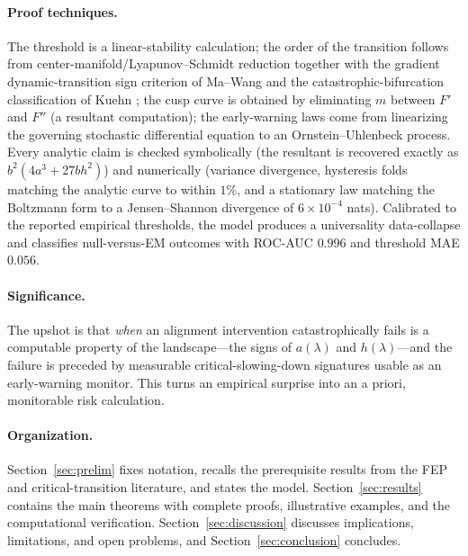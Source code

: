 \paragraph{Proof techniques.}
The threshold is a linear-stability calculation; the order of the transition follows from
center-manifold/Lyapunov--Schmidt reduction together with the gradient dynamic-transition
sign criterion of Ma--Wang \cite{mawang2008} and the catastrophic-bifurcation classification
of Kuehn \cite{kuehn2011}; the cusp curve is obtained by eliminating $m$ between $F'$ and
$F''$ (a resultant computation); the early-warning laws come from linearizing the governing
stochastic differential equation to an Ornstein--Uhlenbeck process. Every analytic claim is
checked symbolically (the resultant is recovered exactly as $b^2(4a^3+27bh^2)$) and numerically
(variance divergence, hysteresis folds matching the analytic curve to within $1\%$, and a
stationary law matching the Boltzmann form to a Jensen--Shannon divergence of
$6\times10^{-4}$ nats). Calibrated to the reported empirical thresholds, the model produces a
universality data-collapse and classifies null-versus-EM outcomes with ROC-AUC $0.996$ and
threshold MAE $0.056$.

\paragraph{Significance.}
The upshot is that \emph{when} an alignment intervention catastrophically fails is a computable
property of the landscape---the signs of $a(\lambda)$ and $h(\lambda)$---and the failure is
preceded by measurable critical-slowing-down signatures usable as an early-warning monitor.
This turns an empirical surprise into an a priori, monitorable risk calculation.

\paragraph{Organization.}
Section~\ref{sec:prelim} fixes notation, recalls the prerequisite results from the FEP and
critical-transition literature, and states the model. Section~\ref{sec:results} contains the
main theorems with complete proofs, illustrative examples, and the computational verification.
Section~\ref{sec:discussion} discusses implications, limitations, and open problems, and
Section~\ref{sec:conclusion} concludes.
